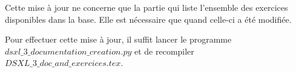 
Cette mise à jour ne concerne que la partie qui liste l'ensemble des exercices disponibles dans la base. Elle est nécessaire que quand celle-ci a été modifiée. 

Pour effectuer cette mise à jour, il suffit lancer le programme  $dsxl\_3\_documentation\_creation.py$ et de recompiler  $DSXL\_3\_doc\_and\_exercices.tex$.  






